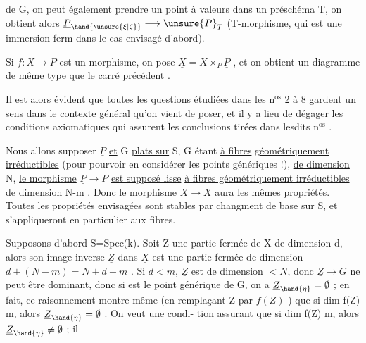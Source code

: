 de G, on peut également prendre un point à valeurs dans un préschéma T,
on obtient alors $\underline{P}_{\hand{\unsure{\xi|\zeta}}} \longrightarrow \unsure{P}_T$ (T-morphisme, qui est une immersion ferm
dans le cas envisagé d'abord).

Si $f:X \longrightarrow P$ est un morphisme, on pose $\underline{X} = X\times_P\underline{P}$ , et on obtient
un diagramme de même type que le carré précédent
.

Il est alors évident que toutes les questions étudiées dans les n$^{\text{os}}$ 2 à 8
gardent un sens dans le contexte général qu'on vient de poser, et il y a
lieu de dégager les conditions axiomatiques qui assurent les conclusions
tirées dans lesdits n$^{\text{os}}$ .

Nous allons supposer $\underline{P}$ \uline{et} G \uline{plats sur} S, G étant \uline{à fibres}
\uline{géométriquement irréductibles} (pour pourvoir en considérer les points
génériques !), \uline{de dimension} N, \uline{le morphisme} $\underline{P} \longrightarrow P$ \uline{est supposé lisse}
\uline{à fibres géométriquement irréductibles de dimension N-m} . Donc le
morphisme $\underline{X} \longrightarrow X$ aura les mêmes propriétés. Toutes les propriétés
envisagées  sont stables par changment de base sur S, et s'appliqueront
en particulier aux fibres.

Supposons d'abord S=Spec(k). Soit Z une partie fermée de X de
dimension d, alors son image inverse $\underline{Z}$ dans $\underline{X}$ est une partie fermée de
dimension $d + (N-m) = N + d-m$ . Si $d < m$, $\underline{Z}$ est de dimension $< N$,
donc $\underline{Z} \longrightarrow G$ ne peut être dominant, donc si \hand{$\eta$} est le point générique de
G, on a $\underline{Z}_{\hand{\eta}} = \emptyset$ ; en fait, ce raisonnement montre même (en remplaçant
Z par $\overline{f(Z)}$ ) que si dim f(Z) \hand{$<$} m, alors $\underline{Z}_{\hand{\eta}} = \emptyset$ . On veut une condi-%
tion  assurant que si dim f(Z) \over{\unsure{$<$}}{$\geq$} m, alors $\underline{Z}_{\hand{\eta}} \neq \emptyset$ ;  il

